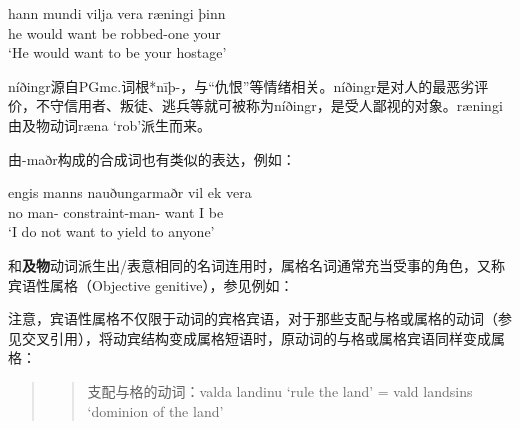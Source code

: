 \begin{enumerate}[itemindent=1em]
\begin{exe}
              \ex \gll
              hann mundi vilja vera ræningi þinn\\
              he would want be robbed-one your\\
              \trans `He would want to be your hostage'
          \end{exe}

          níðingr源自PGmc.词根*nīþ-，与“仇恨”等情绪相关。níðingr是对人的最恶劣评价，不守信用者、叛徒、逃兵等就可被称为níðingr，是受人鄙视的对象。ræningi由及物动词ræna `rob'派生而来。

          由-maðr构成的合成词也有类似的表达，例如：
          \begin{exe}
              \ex \gll
              engis manns nauðungarmaðr vil ek vera\\
              no man-{\gen} constraint-man-{\nom} want I be\\
              \trans `I do not want to yield to anyone’
          \end{exe}

          和\textbf{及物}动词派生出/表意相同的名词连用时，属格名词通常充当受事的角色，又称宾语性属格（Objective genitive），参见例如：
          \begin{exe}
              \ex
              \begin{xlist}

              \end{xlist}
          \end{exe}

          注意，宾语性属格不仅限于动词的宾格宾语，对于那些支配与格或属格的动词（参见交叉引用），将动宾结构变成属格短语时，原动词的与格或属格宾语同样变成属格：
          \begin{quote}
              \begin{quote}
                  支配与格的动词：valda landinu `rule the land' = vald landsins `dominion of the land'


\end{quote}
\end{quote}
\end{enumerate}
